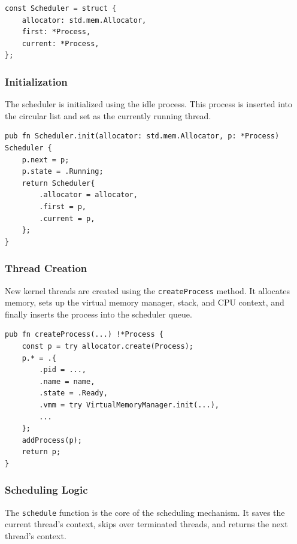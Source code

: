 \documentclass[12pt]{extarticle}
\begin{document}
\begin{lstlisting}[language=zig, breaklines=true, basicstyle=\ttfamily\footnotesize]
const Scheduler = struct {
    allocator: std.mem.Allocator,
    first: *Process,
    current: *Process,
};
\end{lstlisting}

\subsubsection*{Initialization}

The scheduler is initialized using the idle process. This process is inserted into the circular list and set as the currently running thread.

\begin{lstlisting}[language=zig, breaklines=true, basicstyle=\ttfamily\footnotesize]
pub fn Scheduler.init(allocator: std.mem.Allocator, p: *Process) Scheduler {
    p.next = p;
    p.state = .Running;
    return Scheduler{
        .allocator = allocator,
        .first = p,
        .current = p,
    };
}
\end{lstlisting}

\subsubsection*{Thread Creation}

New kernel threads are created using the \texttt{createProcess} method. It allocates memory, sets up the virtual memory manager, stack, and CPU context, and finally inserts the process into the scheduler queue.

\begin{lstlisting}[language=zig, breaklines=true, basicstyle=\ttfamily\footnotesize]
pub fn createProcess(...) !*Process {
    const p = try allocator.create(Process);
    p.* = .{
        .pid = ...,
        .name = name,
        .state = .Ready,
        .vmm = try VirtualMemoryManager.init(...),
        ...
    };
    addProcess(p);
    return p;
}
\end{lstlisting}

\subsubsection*{Scheduling Logic}

The \texttt{schedule} function is the core of the scheduling mechanism. It saves the current thread’s context, skips over terminated threads, and returns the next thread’s context.
\end{document}
